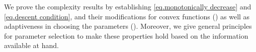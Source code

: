 
We prove the complexity results by establishing \eqref{eq.monotonically decrease} and \eqref{eq.descent condition}, and their modifications for convex functions () as well as adaptiveness in choosing the parameters ().
Moreover, we give general principles for parameter selection to make these properties hold based on the information available at hand.




